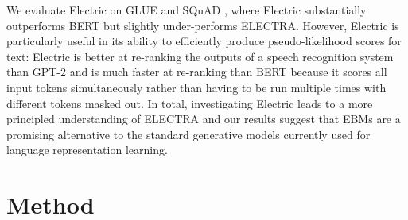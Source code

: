 \documentclass[11pt,a4paper]{article}
\begin{document}
We evaluate Electric on GLUE \citep{wang2018glue} and SQuAD \citep{Rajpurkar2016SQuAD10}, where Electric substantially outperforms BERT but slightly under-performs ELECTRA.  
However, Electric is particularly useful in its ability to efficiently produce pseudo-likelihood scores \citep{Salazar2019MaskedLM} for text: 
Electric is better at re-ranking the outputs of a speech recognition system than GPT-2 \citep{Radford2019LanguageMA} %
and is much faster at re-ranking than BERT because it scores all input tokens simultaneously rather than having to be run multiple times with different tokens masked out.
In total, investigating Electric leads to a more principled understanding of ELECTRA and our results suggest that EBMs are a promising alternative to the standard generative models currently used for language representation learning.







\section{Method}



\end{document}
